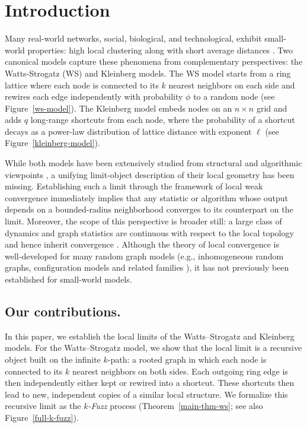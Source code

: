 \documentclass[10pt]{amsart}
\begin{document}
\section{Introduction}
Many real-world networks, social, biological, and technological, exhibit small-world properties: high local clustering along with short average distances \cite{bork2004protein, humphries2006brainstem,telesford2011ubiquity}. Two canonical models capture these phenomena from complementary perspectives: the Watts-Strogatz (WS) \cite{watts} and Kleinberg \cite{kleinberg} models. The WS model starts from a ring lattice where each node is connected to its $k$ nearest neighbors on each side and rewires each edge independently with probability $\phi$ to a random node (see Figure~\ref{ws-model}).
The Kleinberg model embeds nodes on an $n\times n$ grid and adds $q$ long‑range shortcuts from each node, where the probability of a shortcut decays as a power-law distribution of lattice distance with exponent $\ell$ (see Figure~\ref{kleinberg-model}).

While both models have been extensively studied from structural and algorithmic viewpoints  \cite{barrat2000properties,fraigniaud2010searchability,giakkoupis2011optimal,kundu2014network, nguyen2005analyzing, uzzi2007small}, a unifying limit‑object description of their local geometry has been missing. Establishing such a limit through the framework of local weak convergence \cite{oded,Lyons2005,remco} 
immediately implies that any statistic or algorithm whose output depends on a bounded‑radius neighborhood converges to its counterpart on the limit. Moreover,   the scope of this perspective is broader still: a large class of dynamics and graph statistics are continuous with respect to the local topology and hence inherit convergence \cite{alimohammadi2023epidemic,banerjee2024local,lacker2019local,remco}. 
Although the theory of local convergence is well‑developed for many random graph models (e.g., inhomogeneous random graphs, configuration models and related families \cite{BolJanRio07,KomLod20,van2021local}), it has not previously been established for small‑world models.

\subsection*{Our contributions.} 
In this paper, we establish the local limits of the Watts--Strogatz and Kleinberg models. 
For the Watts--Strogatz model, we show that the local limit is a recursive object built on the infinite $k$-path: a rooted graph in which each node is connected to its $k$ nearest neighbors on both sides. Each outgoing ring edge is then independently either kept or rewired into a shortcut. These shortcuts then lead to new, independent copies of a similar local structure. We formalize this recursive limit as the \emph{$k$-Fuzz} process (Theorem~\ref{main-thm-ws}; see also Figure~\ref{full-k-fuzz}).
\end{document}
